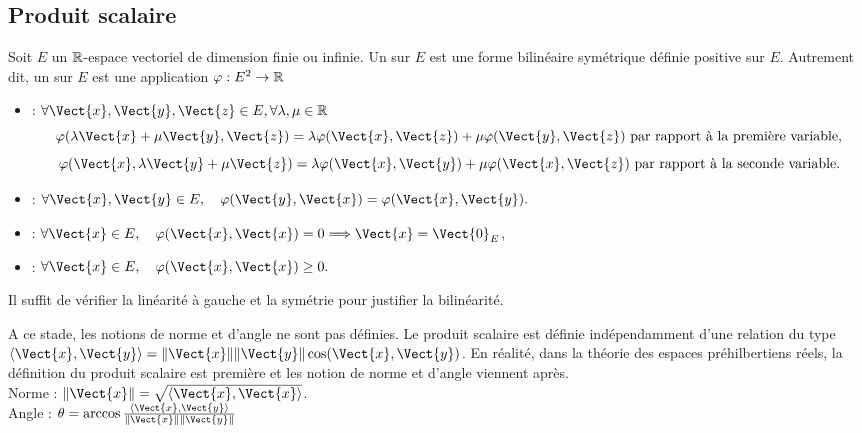 \documentclass{book}
\begin{document}
\subsection{Produit scalaire}
\begin{Definition}
Soit $E$ un $\mathbb{R}$-espace vectoriel de dimension finie ou infinie.
Un  sur $E$ est une forme bilinéaire symétrique définie positive sur $E$.
Autrement dit, un  sur $E$ est une application $\varphi:E^2\to \mathbb{R}$
\begin{itemize}
\item {} :
  $\forall \Vect{x},\Vect{y},\Vect{z}\in E, \forall \lambda ,\mu \in \R$
  $$ \varphi (\lambda \Vect{x}+\mu \Vect{y},\Vect{z}) = \lambda \varphi (\Vect{x},\Vect{z}) + \mu \varphi (\Vect{y},\Vect{z})\text{ par rapport à la première variable}, $$
  $$ \varphi (\Vect{x},\lambda \Vect{y}+\mu \Vect{z}) = \lambda \varphi (\Vect{x},\Vect{y}) + \mu \varphi (\Vect{x},\Vect{z})\text{ par rapport à la seconde variable}. $$
\item {} : $\forall \Vect{x},\Vect{y}\in E, \quad  \varphi (\Vect{y},\Vect{x}) = \varphi (\Vect{x},\Vect{y}).$
\item {} : $\forall \Vect{x}\in E, \quad \varphi (\Vect{x},\Vect{x})=0 \Longrightarrow \Vect{x} = \Vect{0}_E$,
\item {} : $\forall \Vect{x}\in E,\quad \varphi (\Vect{x},\Vect{x})\geq 0.$ 
\end{itemize}
\end{Definition}
Il suffit de vérifier la linéarité à gauche et la symétrie pour justifier la bilinéarité.
\begin{Remarque}
A ce stade, les notions de norme et d'angle ne sont pas définies. Le produit scalaire est définie indépendamment d'une relation du type   $\langle \Vect{x}, \Vect{y} \rangle = \|\Vect{x}\|\|\Vect{y}\| \cos(\Vect{x}, \Vect{y})$. En réalité, dans la théorie des espaces préhilbertiens réels, la définition du produit scalaire est première et les notion de norme et d'angle viennent après.\\
Norme : $\|\Vect{x}\|=\sqrt{\langle \Vect{x}, \Vect{x} \rangle}$.\\
Angle : $\theta=\arccos{\frac{\langle \Vect{x}, \Vect{y} \rangle}{\|\Vect{x}\|\|\Vect{y}\| }}$
\begin{center}
\end{center}
\end{Remarque} 
\end{document}
